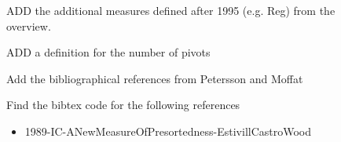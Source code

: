 \begin{figure}
\begin{TODO}
ADD the additional measures defined after 1995 (e.g. Reg) from the overview.
\end{TODO}

\begin{TODO}
ADD a definition for the number of pivots 
\end{TODO}

\begin{TODO}
Add the bibliographical references from Petersson and Moffat
\end{TODO}

\begin{TODO}
Find the bibtex code for the following references
\begin{itemize}
\item 1989-IC-ANewMeasureOfPresortedness-EstivillCastroWood
\end{itemize}
\end{TODO}


\end{figure}
